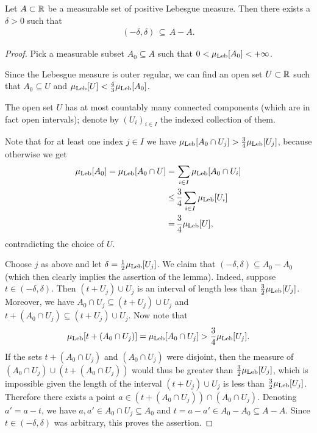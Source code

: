 \begin{lemma}
  \label{lem:difference-set-contains-interval}
  Let $A \subset \mathbb{R}$ be a measurable set of positive Lebesgue measure.
  Then there exists a $\delta > 0$ such that
  \begin{align*}
    (-\delta,\delta) \, \subseteq \, A - A .
  \end{align*}
\end{lemma}
\begin{proof}
  Pick a measurable subset $A_0 \subseteq A$ such that
  $0 < \mu_{\mathrm{Leb}}[A_0] < +\infty$.

  Since the Lebesgue measure is outer regular, we can find an open set $U \subset \mathbb{R}$
  such that $A_0 \subseteq U$ and $\mu_{\mathrm{Leb}}[U] < \frac{4}{3} \mu_{\mathrm{Leb}}[A_0]$.

  The open set $U$ has at most countably many connected components
  (which are in fact open intervals); denote
  by $(U_i)_{i \in I}$ the indexed collection of them.

  Note that for at least one index $j \in I$ we have $\mu_{\mathrm{Leb}}[A_0 \cap U_j] > \frac{3}{4} \mu_{\mathrm{Leb}}[U_j]$,
  because otherwise we get
  \begin{align*}
    \mu_{\mathrm{Leb}}[A_0] = \mu_{\mathrm{Leb}}[A_0 \cap U]
    = \, & \sum_{i \in I} \mu_{\mathrm{Leb}}[A_0 \cap U_i] \\
    \le \, & \frac{3}{4} \sum_{i \in I} \mu_{\mathrm{Leb}}[U_i] \\
    = \, & \frac{3}{4} \mu_{\mathrm{Leb}}[U],
  \end{align*}
  contradicting the choice of $U$.

  Choose $j$ as above and let $\delta = \frac{1}{2} \mu_{\mathrm{Leb}}[U_j]$.
  We claim that $(-\delta,\delta) \subseteq A_0 - A_0$ (which then
  clearly implies the assertion of the lemma).
  Indeed, suppose $t \in (-\delta,\delta)$.
  Then $(t+U_j) \cup U_j$ is an interval of length less than $\frac{3}{2} \mu_{\mathrm{Leb}}[U_j]$.
  Moreover, we have $A_0 \cap U_j \subseteq (t+U_j) \cup U_j$ and
  $t+(A_0 \cap U_j) \subseteq (t+U_j) \cup U_j$. Now note that
  \begin{align*}
    \mu_{\mathrm{Leb}}[t + (A_0 \cap U_j)] = \mu_{\mathrm{Leb}}[A_0 \cap U_j] > \frac{3}{4} \mu_{\mathrm{Leb}}[U_j] .
  \end{align*}
  If the sets $t + (A_0 \cap U_j)$ and $(A_0 \cap U_j)$ were disjoint, then
  the measure of $(A_0 \cap U_j) \cup (t+(A_0 \cap U_j))$ would thus be
  greater than $\frac{3}{2} \mu_{\mathrm{Leb}}[U_j]$, which is impossible given the length
  of the interval $(t+U_j) \cup U_j$ is less than $\frac{3}{2} \mu_{\mathrm{Leb}}[U_j]$.
  Therefore there exists a point $a \in (t + (A_0 \cap U_j)) \cap (A_0 \cap U_j)$.
  Denoting $a' = a - t$, we have $a, a' \in A_0 \cap U_j \subseteq A_0$
  and $t = a - a' \in A_0 - A_0 \subseteq A - A$. Since $t \in (-\delta,\delta)$
  was arbitrary, this proves the assertion.
\end{proof}
